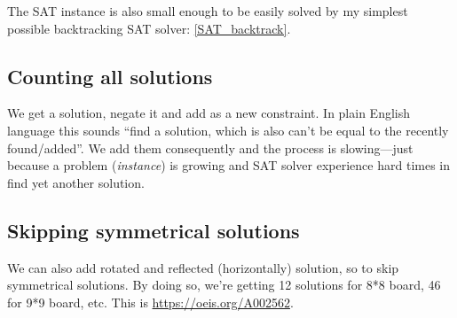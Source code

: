 The SAT instance is also small enough to be easily solved by my simplest possible backtracking SAT solver:
\ref{SAT_backtrack}.

\subsection{Counting all solutions}

We get a solution, negate it and add as a new constraint.
In plain English language this sounds ``find a solution, which is also can't be equal to the recently found/added''.
We add them consequently and the process is slowing---just because a problem (\emph{instance}) is growing and SAT solver
experience hard times in find yet another solution.

\subsection{Skipping symmetrical solutions}

We can also add rotated and reflected (horizontally) solution, so to skip symmetrical solutions.
By doing so, we're getting 12 solutions for 8*8 board, 46 for 9*9 board, etc.
This is \url{https://oeis.org/A002562}.

